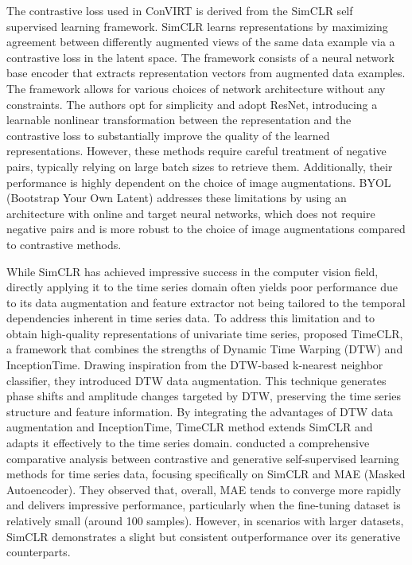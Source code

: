 \documentclass[12pt,twoside,a4paper,parskip]{scrbook} %
\begin{document}
The contrastive loss used in ConVIRT is derived from the SimCLR \cite{chen2020simple} self supervised learning framework. SimCLR learns representations by maximizing agreement between differently augmented views of the same data example via a contrastive loss in the latent space. The framework consists of a neural network base encoder that extracts representation vectors from augmented data examples. The framework allows for various choices of network architecture without any constraints. The authors opt for simplicity and adopt ResNet, introducing a learnable nonlinear transformation between the representation and the contrastive loss to substantially improve the quality of the learned representations. However, these methods require careful treatment of negative pairs, typically relying on large batch sizes to retrieve them. Additionally, their performance is highly dependent on the choice of image augmentations. BYOL (Bootstrap Your Own Latent) \cite{grill2020bootstrap} addresses these limitations by using an architecture with online and target neural networks, which does not require negative pairs and is more robust to the choice of image augmentations compared to contrastive methods.

While SimCLR has achieved impressive success in the computer vision field, directly applying it to the time series domain often yields poor performance due to its data augmentation and feature extractor not being tailored to the temporal dependencies inherent in time series data. To address this limitation and to obtain high-quality representations of univariate time series, \cite{YANG2022108606} proposed TimeCLR, a framework that combines the strengths of Dynamic Time Warping (DTW) and InceptionTime. Drawing inspiration from the DTW-based k-nearest neighbor classifier, they introduced DTW data augmentation. This technique generates phase shifts and amplitude changes targeted by DTW, preserving the time series structure and feature information. By integrating the advantages of DTW data augmentation and InceptionTime, TimeCLR method extends SimCLR and adapts it effectively to the time series domain.
\cite{liu2024selfsupervised} conducted a comprehensive comparative analysis between contrastive and generative self-supervised learning methods for time series data, focusing specifically on SimCLR and MAE (Masked Autoencoder). They observed that, overall, MAE tends to converge more rapidly and delivers impressive performance, particularly when the fine-tuning dataset is relatively small (around 100 samples). However, in scenarios with larger datasets, SimCLR demonstrates a slight but consistent outperformance over its generative counterparts.
\end{document}
